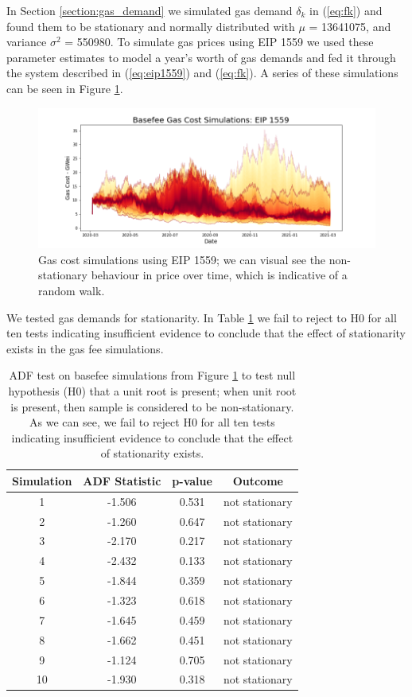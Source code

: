 \documentclass{article}
\begin{document}
In Section \ref{section:gas_demand} we simulated gas demand  $\delta_{k}$ in (\ref{eq:fk}) and found them to be stationary and normally distributed with $\mu$ = 13641075, and variance $\sigma^2$ = 550980. To simulate gas prices using EIP 1559 we used these parameter estimates to model a year's worth of gas demands and fed it through the system described in (\ref{eq:eip1559}) and (\ref{eq:fk}). A series of these simulations can be seen in Figure \ref{fig:basefee_simulations}.

\begin{figure}
\centering
\includegraphics[width=5in]{basefee_simulations.png}
\caption{Gas cost simulations using EIP 1559; we can visual see the non-stationary behaviour in price over time, which is indicative of a random walk.}  
\label{fig:basefee_simulations}
\end{figure} 

We tested gas demands for stationarity. In Table \ref{fig:basefee_simulations} we fail to reject to H0 for all ten tests indicating insufficient evidence to conclude that the effect of stationarity exists in the gas fee simulations. 

\begin{table}
\centering
\begin{tabular}{ |c|c|c|c| } 
\hline
 Simulation & ADF Statistic & p-value & Outcome \\
\hline
1 & -1.506 & 0.531 & not stationary \\
2 & -1.260 & 0.647 & not stationary \\
3 & -2.170 & 0.217 & not stationary \\
4 & -2.432 & 0.133 & not stationary \\
5 & -1.844 & 0.359 & not stationary \\
6 & -1.323 & 0.618 & not stationary \\
7 & -1.645 & 0.459 & not stationary \\
8 & -1.662 & 0.451 & not stationary \\
9 & -1.124 & 0.705 & not stationary \\
10 & -1.930 & 0.318 & not stationary \\
\hline
\end{tabular}
\caption{ADF test on basefee simulations from Figure \ref{fig:basefee_simulations} to test null hypothesis (H0) that a unit root is present; when unit root is present, then sample is considered to be non-stationary. As we can see, we fail to reject H0 for all ten tests indicating insufficient evidence to conclude that the effect of stationarity exists.}
\label{table:pow_vs_pos}
\end{table}
\end{document}
